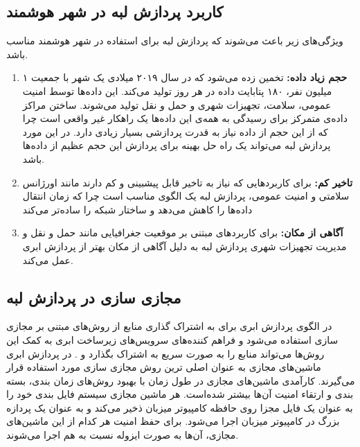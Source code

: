     \subsection{کاربرد پردازش لبه در شهر هوشمند}
      ویژگی‌های زیر باعث می‌شوند که پردازش لبه برای استفاده در شهر هوشمند مناسب باشد.
      \begin{enumerate}
        \item \textbf{حجم زیاد داده:}
          تخمین زده می‌شود که در سال ۲۰۱۹ میلادی یک شهر با جمعیت ۱ میلیون نفر، ۱۸۰ پتابایت داده در هر روز تولید می‌کند\cite{index2015forecast}.
          این داده‌ها توسط امنیت عمومی، سلامت، تجهیزات شهری و حمل و نقل تولید می‌شوند.
          ساختن مراکز داده‌ی متمرکز برای رسیدگی به همه‌ی این داده‌ها یک راهکار غیر واقعی است چرا که از این حجم از داده نیاز به قدرت پردازشی بسیار زیادی دارد.
          در این مورد پردازش لبه می‌تواند یک راه حل بهینه برای پردازش این حجم عظیم از داده‌ها باشد.

        \item \textbf{تاخیر کم:}
          برای کاربرد‌هایی که نیاز به تاخیر قابل پیشبینی و کم دارند مانند اورژانس سلامتی و امنیت عمومی، پردازش لبه یک الگوی مناسب است چرا که زمان انتقال داده‌ها را کاهش می‌دهد و ساختار شبکه را ساده‌تر می‌کند
        \item \textbf{آگاهی از مکان:}
          برای کاربرد‌های مبتنی بر موقعیت جغرافیایی مانند حمل و نقل و مدیریت تجهیزات شهری پردازش لبه به دلیل آگاهی از مکان بهتر از پردازش ابری عمل می‌کند.
      \end{enumerate}

    \subsection{مجازی سازی در پردازش لبه}
      در الگوی پردازش ابری برای به اشتراک گذاری منابع از روش‌های مبتنی بر مجازی سازی استفاده می‌شود و فراهم کننده‌های سرویس‌های زیرساخت ابری به کمک این روش‌ها می‌تواند منابع را به صورت سریع به اشتراک بگذارد \cite{pahl2015containers} و \cite{jain2016overview}.
      در پردازش ابری ماشین‌های مجازی  به عنوان اصلی ترین روش مجازی سازی مورد استفاده قرار می‌گیرند.
      کارآمدی ماشین‌های مجازی در طول زمان با بهبود روش‌های زمان بندی، بسته بندی و ارتقاء امنیت آن‌ها بیشتر شده‌است.
      هر ماشین مجازی سیستم فایل بندی خود را به عنوان یک فایل مجزا روی حافظه کامپیوتر میزبان ذخیر می‌کند و به عنوان یک پردازه بزرگ در کامپیوتر میزبان اجرا می‌شود.
      برای حفظ امنیت هر کدام از این ماشین‌های مجازی، آن‌ها به صورت ایزوله نسبت به هم اجرا می‌شوند.

